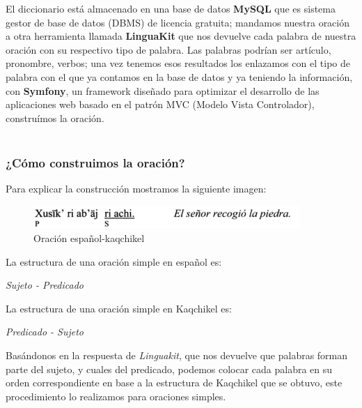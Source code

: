 \documentclass[a4paper,openright,11pt]{article}
\begin{document}
El diccionario está almacenado en una base de datos \textbf{MySQL} que es sistema gestor de base de datos (DBMS) de licencia gratuita; mandamos nuestra oración a otra herramienta llamada \textbf{LinguaKit} que nos devuelve cada palabra de nuestra oración con su respectivo tipo de palabra. Las palabras podrían ser artículo, pronombre, verbos; una vez tenemos esos resultados los enlazamos con el tipo de palabra con el que ya contamos en la base de datos y ya teniendo la información, con \textbf{Symfony}, un framework diseñado para optimizar el desarrollo de las aplicaciones web basado en el patrón MVC (Modelo Vista Controlador), construímos la oración.\\\\

\subsubsection{¿Cómo construimos la oración?}
Para explicar la construcción mostramos la siguiente imagen:\\
\begin{figure}[H]
	\centering
	\includegraphics[width=0.9\textwidth]{oracion}
	\caption{Oración español-kaqchikel}
	\label{fig:kaq}
\end{figure}
La estructura de una oración simple en español es:
\begin{center}
	\textit{Sujeto - Predicado}\\
\end{center}

La estructura de una oración simple en Kaqchikel es:
\begin{center}
	\textit{Predicado - Sujeto}\\
\end{center}

Basándonos en la respuesta de \textit{Linguakit}, que nos devuelve que palabras forman parte del sujeto, y cuales del predicado, podemos colocar cada palabra en su orden correspondiente en base a la estructura de Kaqchikel que se obtuvo, este procedimiento lo realizamos para oraciones simples.

\newpage
\end{document}
